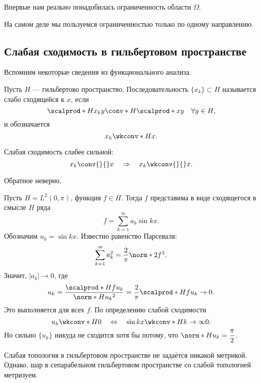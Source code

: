 \begin{note}
Впервые нам реально понадобилась ограниченность области $\Omega$.
\end{note}

\begin{note}
На самом деле мы пользуемся ограниченностью только по одному направлению. 
\end{note}

\subsection{Слабая сходимость в гильбертовом пространстве}
Вспомним некоторые сведения из функционального анализа.
\begin{definition}
Пусть $H$ --- гильбертово пространство. Последовательность $\{x_k \} \subset H$ называется слабо сходящейся к $x$, если
$$\scalprod*{H}{x_k}{y} \conv*{H}{} \scalprod*{}{x}{y} \quad \forall y \in H,$$
и обозначается
$$ x_k \wkconv*{H}{} x.$$
\end{definition}

\begin{note}
Слабая сходимость слабее сильной:
$$ x_k \conv{}{} x \quad \Rightarrow \quad x_k \wkconv{}{} x.$$
\end{note}

\begin{note}
Обратное неверно.
\end{note}

\begin{example} Пусть $H = L^2(0, \pi)$, функция $f \in H$. Тогда $f$ представима в виде сходящегося в смысле $H$ ряда
$$ f = \sum_{k=1}^\infty a_k \sin kx.$$
Обозначим $u_k = \sin kx$. Известно равенство Парсеваля:
$$ \sum_{k=1}^\infty a_k^2 = \frac {2} {\pi} \norm*{2}{f}^2.$$
Значит, $|a_k| \to 0$, где
$$ a_k = \frac {\scalprod*{H}{f}{u_k}} {\norm*{H}{u_k}^2} = \frac {2} {\pi} \scalprod*{H}{f}{u_k} \to 0.$$
Это выполняется для всех $f$. По определению слабой сходимости
$$ u_k \wkconv*{H}{} 0 \quad \Leftrightarrow \quad \sin kx \wkconv*{H}{k \to \infty} 0.$$
Но сильно $\{ u_k \}$ никуда не сходится хотя бы потому, что $\displaystyle \norm*{H}{u_k} = \frac {\pi} {2}$.
\end{example}

\begin{note}
Слабая топология в гильбертовом пространстве не задаётся никакой метрикой. Однако, шар в сепарабельном гильбертовом пространстве со слабой топологией метризуем.
\end{note}

